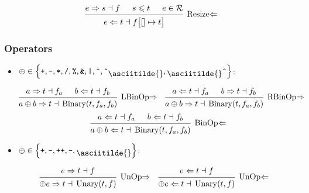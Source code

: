 \documentclass{article}
\DeclareMathOperator{\Binary}{Binary}
\DeclareMathOperator{\Unary}{Unary}
\newcommand{\mytilde}{\raisebox{-.7ex}{\asciitilde{}}}
\newcommand{\binOp}{\ensuremath{\left\{
      \texttt{+}, \texttt{-}, \texttt{*}, \texttt{/}, \texttt{\%}, \texttt{\&},
      \texttt{|}, \texttt{\^{}}, \texttt{\^{}}\mytilde, \mytilde\texttt{\^{}}
      \right\}}}
\newcommand{\unOp}{\ensuremath{\left\{
      \texttt{+}, \texttt{-}, \texttt{++}, \texttt{--}, \mytilde
    \right\}}}
\renewcommand{\S}{\ensuremath{\Rightarrow}}
\newcommand{\C}{\ensuremath{\Leftarrow}}
\newcommand{\s}[3]{#1 \S{} #2 \dashv{} #3}
\renewcommand{\c}[3]{#1 \C{} #2 \dashv{} #3}
\begin{document}
\begin{equation*}
	\begin{prooftree}
		\hypo{\s{e}{s}{f}}
		\hypo{s \leqslant t}
		\hypo{e \in \mathcal{R}}
		\infer3[Resize\C]{\c{e}{t}{f\big[{[]}\mapsto t\big]}}
	\end{prooftree}
\end{equation*}

\subsubsection*{Operators}

\begin{itemize}[leftmargin=*]
	\setlength{\itemsep}{2em}

	\item $\oplus \in \binOp$:

	      \begin{align*}
		       &
		      \begin{prooftree}
			      \hypo{\s{a}{t}{f_a}}
			      \hypo{\c{b}{t}{f_b}}
			      \infer2[LBinOp\S]{\s{a\oplus b}{t}{\Binary(t, f_a, f_b)}}
		      \end{prooftree}
		       &
		       &
		      \begin{prooftree}
			      \hypo{\c{a}{t}{f_a}}
			      \hypo{\s{b}{t}{f_b}}
			      \infer2[RBinOp\S]{\s{a\oplus b}{t}{\Binary(t, f_a, f_b)}}
		      \end{prooftree}
	      \end{align*}
	      \vspace*{.5em}
	      \begin{equation*}
		      \begin{prooftree}
			      \hypo{\c{a}{t}{f_a}}
			      \hypo{\c{b}{t}{f_b}}
			      \infer2[BinOp\C]{\c{a\oplus b}{t}{\Binary(t, f_a, f_b)}}
		      \end{prooftree}
	      \end{equation*}

	\item $\oplus \in \unOp$:

	      \begin{align*}
		       &
		      \begin{prooftree}
			      \hypo{\s{e}{t}{f}}
			      \infer1[UnOp\S]{\s{\oplus e}{t}{\Unary(t, f)}}
		      \end{prooftree}
		       &
		       &
		      \begin{prooftree}
			      \hypo{\c{e}{t}{f}}
			      \infer1[UnOp\C]{\c{\oplus e}{t}{\Unary(t, f)}}
		      \end{prooftree}
	      \end{align*}


\end{itemize}
\end{document}
